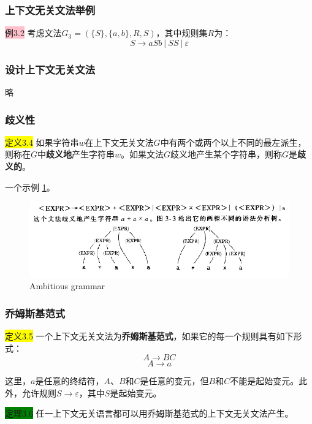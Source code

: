 \documentclass[a4paper]{article}
\begin{document}
\subsubsection{上下文无关文法举例}

	\colorbox{pink}{例3.2} 考虑文法$G_3=(\{S\},\{a,b\},R,S)$，其中规则集$R$为：
	$$S \rightarrow aSb~|~SS~|~\varepsilon $$

\subsubsection{设计上下文无关文法}

	略

\subsubsection{歧义性}

	\colorbox{yellow}{定义3.4} 如果字符串$w$在上下文无关文法$G$中有两个或两个以上不同的最左派生，则称在$G$中\textbf{歧义地}产生字符串$w$。如果文法$G$歧义地产生某个字符串，则称$G$是\textbf{歧义的}。

	一个示例 \ref{F030104}。

	\begin{figure}[htb]
		\centering
		\includegraphics[scale=0.8]{./figure/3.1.4.png}
		\caption{Ambitious grammar}
		\label{F030104}
	\end{figure}

\subsubsection{乔姆斯基范式}

	\colorbox{yellow}{定义3.5} 一个上下文无关文法为\textbf{乔姆斯基范式}，如果它的每一个规则具有如下形式：
		$$ A \rightarrow BC $$
		$$ A \rightarrow a $$

	这里，$a$是任意的终结符，$A$、$B$和$C$是任意的变元，但$B$和$C$不能是起始变元。此外，允许规则$S \rightarrow \varepsilon$，其中$S$是起始变元。
	
	\colorbox{green}{定理3.6} 任一上下文无关语言都可以用乔姆斯基范式的上下文无关文法产生。
	
\end{document}
